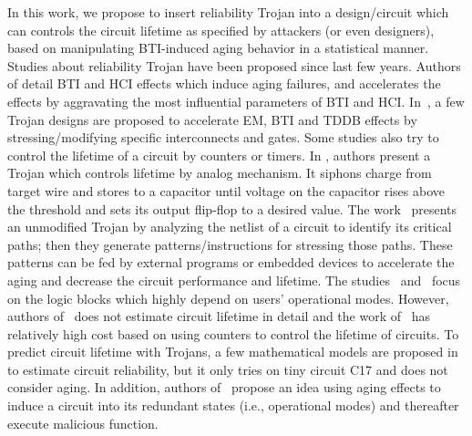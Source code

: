 In this work, we propose to insert reliability Trojan into a design/circuit which can controls the circuit lifetime as specified by attackers (or even designers), based on manipulating BTI-induced aging behavior in a statistical manner. Studies about reliability Trojan have been proposed since last few years. Authors of \cite{shiyanovskii2010process} detail BTI and HCI effects which induce aging failures, and accelerates the effects by aggravating the most influential parameters of BTI and HCI. In~\cite{sreedhar2012reliability}, a few Trojan designs are proposed to accelerate EM, BTI and TDDB effects by stressing/modifying specific interconnects and gates. Some studies also try to control the lifetime of a circuit by counters or timers. In \cite{yang2016a2}, authors present a Trojan which controls lifetime by analog mechanism. It siphons charge from target wire and stores to a capacitor until voltage on the capacitor rises above the threshold and sets its output flip-flop to a desired value.  The work~\cite{karimi2015magic} presents an unmodified Trojan by analyzing the netlist of a circuit to identify its critical paths; then they generate patterns/instructions for stressing those paths. These patterns can be fed by external programs or embedded devices to accelerate the aging and decrease the circuit performance and lifetime. The studies~\cite{yang2016a2} and~\cite{karimi2015magic} focus on the logic blocks which highly depend on users' operational modes. However, authors of~\cite{shiyanovskii2010process} does not estimate circuit lifetime in detail and the work of~\cite{sreedhar2012reliability} has relatively high cost based on using counters to control the lifetime of circuits. To predict circuit lifetime with Trojans, a few mathematical models are proposed in~\cite{burman2012effect} to estimate circuit reliability, but it only tries on tiny circuit C17 and does not consider aging. In addition, authors of~\cite{wei2013undetectable} propose an idea using aging effects to induce a circuit into its redundant states (i.e., operational modes) and thereafter execute malicious function.

